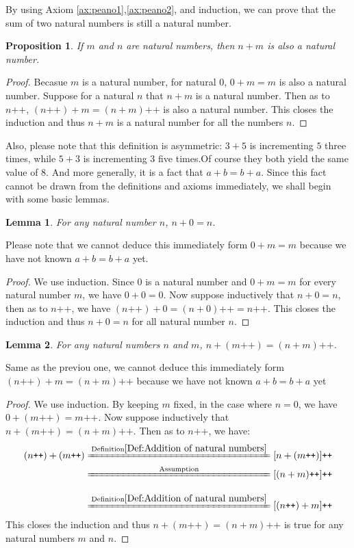 \documentclass[a4paper]{book}
\newtheorem*{proof}{\textit{Proof.}}
\theoremstyle{break}
\newtheorem{lemma}{Lemma}[section]
\newtheorem{proposition}{Proposition}[section]
\begin{document}
			By using Axiom \ref{ax:peano1},\ref{ax:peano2}, and induction, we can prove that the sum of two natural numbers is still a natural number. 
			\begin{proposition}
				If $m$ and $n$ are natural numbers, then $n+m$ is also a natural number.
			\end{proposition}
			\begin{proof}
				Becasue $m$ is a natural number, for natural $0$, $0+m=m$ is also a natural number. Suppose for a natural $n$ that $n+m$ is a natural number. Then as to $n\texttt{++}$, $(n\texttt{++})+m = (n+m)\texttt{++}$ is also a natural number. This closes the induction and thus $n+m$ is a natural number for all the numbers $n$.
			\end{proof}
			Also, please note that this definition is asymmetric: $3+5$ is incrementing $5$ three times, while $5+3$ is incrementing $3$ five times.Of course they both yield the same value of $8$. And more generally, it is a fact that $a+b=b+a$. Since this fact cannot be drawn from the definitions and axioms immediately, we shall begin with some basic lemmas.\\
			\begin{lemma}
				\label{lam:n+0=n}
				For any natural number $n$, $n+0=n$.
			\end{lemma}
			Please note that we cannot deduce this immediately form $0+m=m$ because we have not known $a+b=b+a$ yet.
			\begin{proof}
				We use induction. Since $0$ is a natural number and $0+m=m$ for every natural number $m$, we have $0+0=0$. Now suppose inductively that $n+0=n$, then as to $n\texttt{++}$, we have $(n\texttt{++})+0=(n+0)\texttt{++}=n\texttt{++}$. This closes the induction and thus $n+0=n$ for all natural number $n$.
			\end{proof}
			\begin{lemma}
				\label{lam:n+(m++)=(n+m)++}
				For any natural numbers $n$ and $m$, $n+(m\texttt{++})=(n+m)\texttt{++}$.
			\end{lemma}
			Same as the previou one, we cannot deduce this immediately form $(n\texttt{++})+m=(n+m)\texttt{++}$ because we have not known $a+b=b+a$ yet 
			\begin{proof}
				We use induction. By keeping $m$ fixed, in the case where $n=0$, we have $0+(m\texttt{++})=m\texttt{++}$. Now suppose inductively that $n+(m\texttt{++})=(n+m)\texttt{++}$. Then as to $n\texttt{++}$, we have:
				\begin{align*}
				(n\texttt{++})+(m\texttt{++})&\xlongequal{\mathrm{Definition \ref{Def:Addition of natural numbers}}}[n+(m\texttt{++})]\texttt{++}\\
				&\xlongequal[\phantom{\mathrm{Definition \ref{Def:Addition of natural numbers}}}]{\mathrm{Assumption}}[(n+m)\texttt{++}]\texttt{++}\\
				&\xlongequal{\mathrm{Definition \ref{Def:Addition of natural numbers}}}[(n\texttt{++})+m]\texttt{++}
				\end{align*}
				This closes the induction and thus $n+(m\texttt{++})=(n+m)\texttt{++}$ is true for any natural numbers $m$ and $n$.
			\end{proof}
\end{document}
